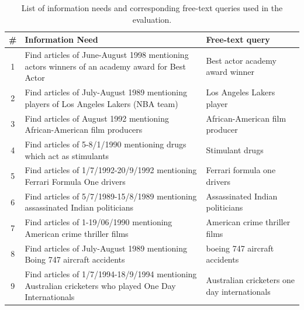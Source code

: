 \documentclass[twocolumn]{svjour3}
\begin{document}
\begin{table}[]
\centering
\caption{List of information needs and corresponding free-text queries used in the evaluation.}
\vspace{-1mm}
\setlength{\tabcolsep}{2.5pt}
\label{tbl:info-needs}
\begin{tabular}{|c|p{120mm}|p{44mm}|}
\hline
\rowcolor[HTML]{EFEFEF}
\textbf{\#}              & \textbf{Information Need}                                                                                 & \textbf{Free-text query}                     \\ \hline
1                        & Find articles of June-August 1998 mentioning actors winners of an academy award for Best Actor           & Best actor academy award winner              \\ \hline
2                        & Find articles of July-August 1989 mentioning players of Los Angeles Lakers (NBA team)                    & Los Angeles Lakers player                    \\ \hline
3                        & Find articles of August 1992 mentioning African-American film producers                            & African-American film producer               \\ \hline
4                        & Find articles of 5-8/1/1990 mentioning drugs which act as stimulants                                     & Stimulant drugs                              \\ \hline
5                        & Find articles of 1/7/1992-20/9/1992 mentioning Ferrari Formula One drivers                               & Ferrari formula one drivers                  \\ \hline
6                        & Find articles of 5/7/1989-15/8/1989 mentioning assassinated Indian politicians                           & Assassinated Indian politicians              \\ \hline
7                        & Find articles of 1-19/06/1990 mentioning American crime thriller films                                   & American crime thriller films                \\ \hline
8                        & Find articles of July-August 1989 mentioning Boing 747 aircraft accidents                                & boeing 747 aircraft accidents                \\ \hline
9                        & Find articles of 1/7/1994-18/9/1994 mentioning Australian cricketers who played One Day Internationals   & Australian cricketers one day internationals \\ \hline

\end{tabular}
\end{table}
\end{document}
